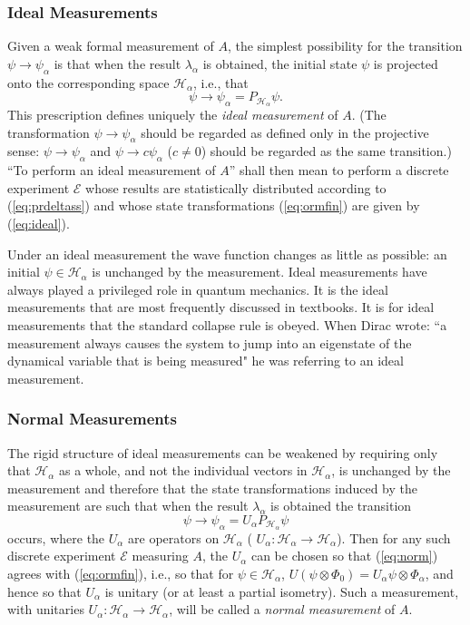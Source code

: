 \documentclass[12pt]{article}
\newcommand{\eq}[1]{(\ref{#1})}
\newcommand{\wf}{wave function}
\renewcommand{\a}{\alpha}
\newcommand{\la}{\lambda_{\a}}
\newcommand{\psia}{\psi_{\a}}
\newcommand{\Ha}{{\H}_{\a}}
\renewcommand{\H}{\mbox{$\mathcal{H}$}}
\newcommand{\Pa}{ P_{ {\mathcal{H}_{\a} } } }
\newcommand{\E}{\mbox{$\mathscr{E}$}}
\begin{document}
\subsubsection{Ideal Measurements} \label{sec:IM}
Given a weak formal measurement of $A$, the simplest possibility for
the transition $\psi\to\psia$ is that when the result $\la$ is
obtained, the initial state $\psi$ is projected onto the corresponding
space $\Ha$, i.e., that
\begin{equation}
\psi \to \psia = \Pa \psi.
\label{eq:ideal}
\end{equation}
%
This prescription defines uniquely the \emph{ideal measurement} of
$A$.  (The transformation $\psi\to\psia$ should be regarded as defined
only in the projective sense: $\psi \to \psi_\a$ and $\psi \to
c\psi_\a$ ($c\neq 0$) should be regarded as the same transition.)
``To perform an ideal measurement of $A$'' shall then mean to perform
a discrete experiment \E{} whose results are statistically distributed
according to (\ref{eq:prdeltass}) and whose state transformations
\eq{eq:ormfin} are given by (\ref{eq:ideal}).

Under an ideal measurement the \wf{} changes as little as possible: an
initial $\psi \in \Ha$ is unchanged by the measurement.  Ideal
measurements have always played a privileged role in quantum
mechanics. It is the ideal measurements that are most frequently
discussed in textbooks. It is for ideal measurements that the standard
collapse rule is obeyed.  When Dirac \cite{Dir30} wrote: ``a
measurement always causes the system to jump into an eigenstate of the
dynamical variable that is being measured" he was referring to an
ideal measurement.

\subsubsection{Normal Measurements}
\label{sec:NM}
The rigid structure of ideal measurements can be weakened by requiring
only that $\Ha$ as a whole, and not the individual vectors in $\Ha$,
is unchanged by the measurement and therefore that the state
transformations induced by the measurement are such that when the
result $\la$ is obtained the transition
\begin{equation}
\psi \to\psia = U_\a \Pa \psi
\label{eq:norm}
\end{equation}
occurs, where the $U_\a$ are operators on $\Ha$ ( $U_\a :\Ha\to\Ha$).
Then for any such discrete experiment \E{} measuring $A$, the $U_\a$
can be chosen so that \eq{eq:norm} agrees with \eq{eq:ormfin}, i.e.,
so that for $\psi \in \Ha$, $U(\psi\otimes\Phi_0) =
U_\a\psi\otimes\Phi_\a$, and hence so that $U_\a$ is unitary (or at
least a partial isometry). Such a measurement, with unitaries $U_\a
:\Ha\to\Ha$, will be called a \emph{normal measurement} of $A$.
\end{document}
